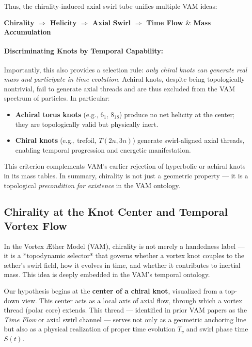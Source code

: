 \documentclass[a4paper,12pt]{article}
\begin{document}
Thus, the chirality-induced axial swirl tube unifies multiple VAM ideas:
\vspace{0.5em}
\begin{center}
\textbf{Chirality $\Rightarrow$ Helicity $\Rightarrow$ Axial Swirl $\Rightarrow$ Time Flow $\&$ Mass Accumulation}
\end{center}

\paragraph{Discriminating Knots by Temporal Capability:}
Importantly, this also provides a selection rule: \emph{only chiral knots can generate real mass and participate in time evolution}. Achiral knots, despite being topologically nontrivial, fail to generate axial threads and are thus excluded from the VAM spectrum of particles. In particular:
\begin{itemize}
    \item \textbf{Achiral torus knots} (e.g., $6_1$, $8_{18}$) produce no net helicity at the center; they are topologically valid but physically inert.
    \item \textbf{Chiral knots} (e.g., trefoil, $T(2n,3n)$) generate swirl-aligned axial threads, enabling temporal progression and energetic manifestation.
\end{itemize}

This criterion complements VAM’s earlier rejection of hyperbolic or achiral knots in its mass tables. In summary, chirality is not just a geometric property --- it is a topological \textit{precondition for existence} in the VAM ontology.

\subsection{Chirality at the Knot Center and Temporal Vortex Flow}

In the Vortex Æther Model (VAM), chirality is not merely a handedness label — it is a *topodynamic selector* that governs whether a vortex knot couples to the æther's swirl field, how it evolves in time, and whether it contributes to inertial mass. This idea is deeply embedded in the VAM's temporal ontology.

Our hypothesis begins at the \textbf{center of a chiral knot}, visualized from a top-down view. This center acts as a local axis of axial flow, through which a vortex thread (polar core) extends. This thread — identified in prior VAM papers as the \textit{Time Flow} or axial swirl channel — serves not only as a geometric anchoring line but also as a physical realization of proper time evolution $T_v$ and swirl phase time $S(t)$.
\end{document}
